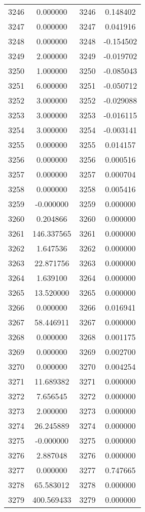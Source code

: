 \documentclass[12pt]{article}
\begin{document}
\begin{longtable}{@{}cccc@{}}
3246 & 0.000000 & 3246 & 0.148402 \\
3247 & 0.000000 & 3247 & 0.041916 \\
3248 & 0.000000 & 3248 & -0.154502 \\
3249 & 2.000000 & 3249 & -0.019702 \\
3250 & 1.000000 & 3250 & -0.085043 \\
3251 & 6.000000 & 3251 & -0.050712 \\
3252 & 3.000000 & 3252 & -0.029088 \\
3253 & 3.000000 & 3253 & -0.016115 \\
3254 & 3.000000 & 3254 & -0.003141 \\
3255 & 0.000000 & 3255 & 0.014157 \\
3256 & 0.000000 & 3256 & 0.000516 \\
3257 & 0.000000 & 3257 & 0.000704 \\
3258 & 0.000000 & 3258 & 0.005416 \\
3259 & -0.000000 & 3259 & 0.000000 \\
3260 & 0.204866 & 3260 & 0.000000 \\
3261 & 146.337565 & 3261 & 0.000000 \\
3262 & 1.647536 & 3262 & 0.000000 \\
3263 & 22.871756 & 3263 & 0.000000 \\
3264 & 1.639100 & 3264 & 0.000000 \\
3265 & 13.520000 & 3265 & 0.000000 \\
3266 & 0.000000 & 3266 & 0.016941 \\
3267 & 58.446911 & 3267 & 0.000000 \\
3268 & 0.000000 & 3268 & 0.001175 \\
3269 & 0.000000 & 3269 & 0.002700 \\
3270 & 0.000000 & 3270 & 0.004254 \\
3271 & 11.689382 & 3271 & 0.000000 \\
3272 & 7.656545 & 3272 & 0.000000 \\
3273 & 2.000000 & 3273 & 0.000000 \\
3274 & 26.245889 & 3274 & 0.000000 \\
3275 & -0.000000 & 3275 & 0.000000 \\
3276 & 2.887048 & 3276 & 0.000000 \\
3277 & 0.000000 & 3277 & 0.747665 \\
3278 & 65.583012 & 3278 & 0.000000 \\
3279 & 400.569433 & 3279 & 0.000000 \\

\end{longtable}
\end{document}
